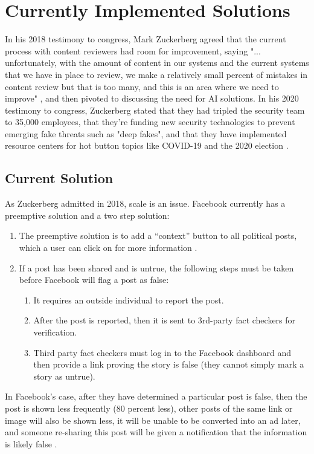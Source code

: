 \section{Currently Implemented Solutions}
In his 2018 testimony to congress, Mark Zuckerberg agreed that the current process with content reviewers had room for improvement, saying "... unfortunately, with the amount of content in our systems and the current systems that we have in place to review, we make a relatively small percent of mistakes in content review but that is too many, and this is an area where we need to improve" \citep{energy2018facebook}, and then pivoted to discussing the need for AI solutions. In his 2020 testimony to congress, Zuckerberg stated that they had tripled the security team to 35,000 employees, that they're funding new security technologies to prevent emerging fake threats such as "deep fakes", and that they have implemented resource centers for hot button topics like COVID-19 and the 2020 election \citep{zuckerberg2020}.

\subsection{Current Solution}
As Zuckerberg admitted in 2018, scale is an issue. Facebook currently has a preemptive solution and a two step solution:
\renewcommand{\labelenumii}{\Roman{enumii}}
\begin{enumerate}
\item The preemptive solution is to add a “context” button to all political posts, which a user can click on for more information \citep{smith2018designing}.
 \item If a post has been shared and is untrue, the following steps must be taken before Facebook will flag a post as false:
 \begin{enumerate}
     \item It requires an outside individual to report the post. 
     \item After the post is reported, then it is  sent to 3rd-party fact checkers for verification. 
     \item Third party fact checkers must log in to the Facebook dashboard and then provide a link proving the story is false (they cannot simply mark a story as untrue).
 \end{enumerate}
 \end{enumerate}
 
 In Facebook’s case, after they have determined a particular post is false, then the post is shown less frequently (80 percent less), other posts of the same link or image will also be shown less, it will be unable to be converted into an ad later, and someone re-sharing this post will be given a notification that the information is likely false \citep{owen2016clamping,facebook_2020}.
 
